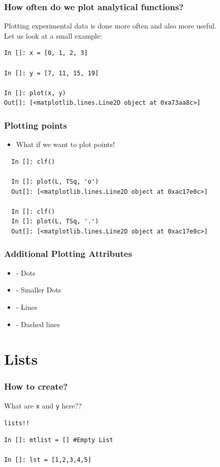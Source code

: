 \documentclass[14pt,compress]{beamer}
\newcommand{\typ}[1]{\lstinline{#1}}
\newcommand{\kwrd}[1]{ \texttt{\textbf{\color{blue}{#1}}}  }
\begin{document}
\begin{frame}[fragile]
\frametitle{How often do we plot analytical functions?}
Plotting experimental data is done more often and also more useful.\\
Let us look at a small example:
\begin{lstlisting}
In []: x = [0, 1, 2, 3]

In []: y = [7, 11, 15, 19]

In []: plot(x, y)
Out[]: [<matplotlib.lines.Line2D object at 0xa73aa8c>]
\end{lstlisting}
\end{frame}

\begin{frame}[fragile]
\frametitle{Plotting points}
\begin{itemize}
\item What if we want to plot points!
\end{itemize}
\begin{lstlisting}
  In []: clf()

  In []: plot(L, TSq, 'o')
  Out[]: [<matplotlib.lines.Line2D object at 0xac17e0c>]

  In []: clf()
  In []: plot(L, TSq, '.')
  Out[]: [<matplotlib.lines.Line2D object at 0xac17e0c>]
\end{lstlisting}
\end{frame}

\begin{frame}[fragile]
\frametitle{Additional Plotting Attributes}
\begin{itemize}
  \item \kwrd{'o'} - Dots
  \item \kwrd{'.'} - Smaller Dots
  \item \kwrd{'-'} - Lines
  \item \kwrd{'- -'} - Dashed lines
\end{itemize}
\end{frame}

\section{Lists}
\begin{frame}[fragile]
  \frametitle{How to create?}
What are \typ{x} and \typ{y} here??\\
\begin{center}
\alert{\typ{lists!!}}
\end{center}
\begin{lstlisting}
In []: mtlist = [] #Empty List

In []: lst = [1,2,3,4,5] 
\end{lstlisting}
\end{frame}
\end{document}
